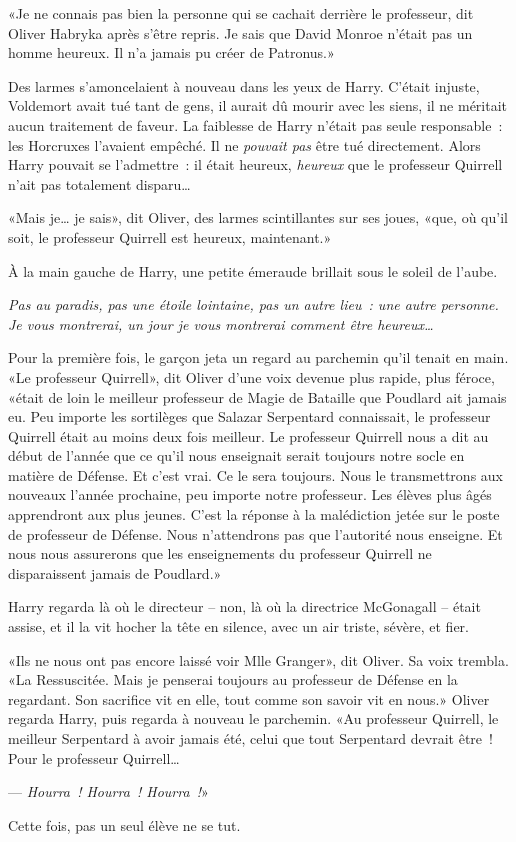 «Je ne connais pas bien la personne qui se cachait derrière le professeur, dit Oliver Habryka après s'être repris. Je sais que David Monroe n'était pas un homme heureux. Il n'a jamais pu créer de Patronus.»

Des larmes s'amoncelaient à nouveau dans les yeux de Harry. C'était injuste, Voldemort avait tué tant de gens, il aurait dû mourir avec les siens, il ne méritait aucun traitement de faveur. La faiblesse de Harry n'était pas seule responsable~: les Horcruxes l'avaient empêché. Il ne \emph{pouvait pas} être tué directement. Alors Harry pouvait se l'admettre~: il était heureux, \emph{heureux} que le professeur Quirrell n'ait pas totalement disparu…

«Mais je… je sais», dit Oliver, des larmes scintillantes sur ses joues, «que, où qu'il soit, le professeur Quirrell est heureux, maintenant.»

À la main gauche de Harry, une petite émeraude brillait sous le soleil de l'aube.

\emph{Pas au paradis, pas une étoile lointaine, pas un autre lieu~: une autre personne. Je vous montrerai, un jour je vous montrerai comment être heureux…}

Pour la première fois, le garçon jeta un regard au parchemin qu'il tenait en main. «Le professeur Quirrell», dit Oliver d'une voix devenue plus rapide, plus féroce, «était de loin le meilleur professeur de Magie de Bataille que Poudlard ait jamais eu. Peu importe les sortilèges que Salazar Serpentard connaissait, le professeur Quirrell était au moins deux fois meilleur. Le professeur Quirrell nous a dit au début de l'année que ce qu'il nous enseignait serait toujours notre socle en matière de Défense. Et c'est vrai. Ce le sera toujours. Nous le transmettrons aux nouveaux l'année prochaine, peu importe notre professeur. Les élèves plus âgés apprendront aux plus jeunes. C'est la réponse à la malédiction jetée sur le poste de professeur de Défense. Nous n'attendrons pas que l'autorité nous enseigne. Et nous nous assurerons que les enseignements du professeur Quirrell ne disparaissent jamais de Poudlard.»

Harry regarda là où le directeur -- non, là où la directrice McGonagall -- était assise, et il la vit hocher la tête en silence, avec un air triste, sévère, et fier.

«Ils ne nous ont pas encore laissé voir Mlle Granger», dit Oliver. Sa voix trembla. «La Ressuscitée. Mais je penserai toujours au professeur de Défense en la regardant. Son sacrifice vit en elle, tout comme son savoir vit en nous.» Oliver regarda Harry, puis regarda à nouveau le parchemin. «Au professeur Quirrell, le meilleur Serpentard à avoir jamais été, celui que tout Serpentard devrait être~! Pour le professeur Quirrell…

--- \emph{Hourra~! Hourra~! Hourra~!}»

Cette fois, pas un seul élève ne se tut.
